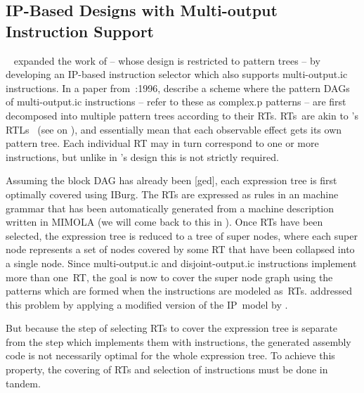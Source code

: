 \subsection{IP-Based Designs with Multi-output Instruction Support}

\citeauthor{LeupersMarwedel:1996}~\cite{LeupersMarwedel:1995,
  LeupersMarwedel:1996} expanded the work of \citeauthor{WilsonEtAl:1994} --
whose design is restricted to \glspl{pattern tree} -- by developing an
\gls{IP}-based \gls{instruction selector} which also supports
\gls{multi-output.ic} \glspl{instruction}.
%
In a paper from~:1996, \citeauthor{LeupersMarwedel:1996} describe a scheme where
the \glspl{pattern DAG} of \gls{multi-output.ic} \glspl{instruction} --
\citeauthor{LeupersMarwedel:1996} refer to these as \gls{complex.p}
\glspl{pattern} -- are first decomposed into multiple \glspl{pattern tree}
according to their \glspl{RT}.
%
\glspl{RT}~are akin to \citeauthor{Fraser:1979}'s \glspl{RTL}~\cite{Fraser:1979}
(see  on
), and essentially mean that each
observable effect gets its own \gls{pattern tree}.
%
Each individual \gls{RT} may in turn correspond to one or more
\glspl{instruction}, but unlike in \citeauthor{Fraser:1979}'s design this is not
strictly required.

Assuming the \gls{block DAG} has already been [ged], each
\gls{expression tree} is first optimally covered using \gls{IBurg}.
%
The \glspl{RT} are expressed as \glspl{rule} in an \gls{machine grammar} that
has been automatically generated from a \gls{machine description} written in
\gls{MIMOLA} (we will come back to this in
).
%
Once \glspl{RT} have been selected, the \gls{expression tree} is reduced to a
\gls{tree} of \glspl{super node}, where each \gls{super node} represents a set
of \glspl{node} covered by some \gls{RT} that have been collapsed into a single
\gls{node}.
%
Since \gls{multi-output.ic} and \gls{disjoint-output.ic} \glspl{instruction}
implement more than one~\gls{RT}, the goal is now to cover the \gls{super node}
\gls{graph} using the \glspl{pattern} which are formed when the
\glspl{instruction} are modeled as~\glspl{RT}.
%
\citeauthor{LeupersMarwedel:1996} addressed this problem by applying a modified
version of the \gls{IP}~model by \citeauthor{WilsonEtAl:1994}.

But because the step of selecting \glspl{RT} to cover the \gls{expression tree}
is separate from the step which implements them with \glspl{instruction}, the
generated \gls{assembly code} is not necessarily optimal for the whole
\gls{expression tree}.
%
To achieve this property, the covering of \glspl{RT} and selection of
\glspl{instruction} must be done in tandem.


